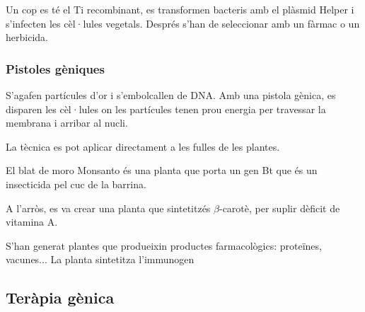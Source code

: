 Un cop es té el Ti recombinant, es transformen bacteris amb el plàsmid
Helper i s'infecten les cèl·lules vegetals. Després s'han de
seleccionar amb un fàrmac o un herbicida.

\subsubsection{Pistoles gèniques}
\label{sec:pistoles-geniques}

S'agafen partícules d'or i s'embolcallen de DNA. Amb una pistola
gènica, es disparen les cèl·lules on les partícules tenen prou energia
per travessar la membrana i arribar al nucli.

La tècnica es pot aplicar directament a les fulles de les plantes.


El blat de moro Monsanto és una planta que porta un gen Bt que és un
insecticida pel cuc de la barrina.

A l'arròs, es va crear una planta que sintetitzés $\beta$-carotè, per
suplir dèficit de vitamina A.

S'han generat plantes que produeixin productes farmacològics:
proteïnes, vacunes... La planta sintetitza l'immunogen

\subsection{Teràpia gènica}
\label{sec:terapia-genica}




